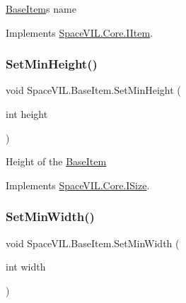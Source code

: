 \mbox{\hyperlink{class_space_v_i_l_1_1_base_item}{Base\+Item}}\textquotesingle{}s name 



Implements \mbox{\hyperlink{interface_space_v_i_l_1_1_core_1_1_i_item}{Space\+V\+I\+L.\+Core.\+I\+Item}}.

\mbox{\label{class_space_v_i_l_1_1_base_item_a5dbc5edca77a56b7998c8cee6b0e9a3a}} 
\subsubsection{\texorpdfstring{Set\+Min\+Height()}{SetMinHeight()}}
{\footnotesize\ttfamily void Space\+V\+I\+L.\+Base\+Item.\+Set\+Min\+Height (\begin{DoxyParamCaption}\item[{int}]{height }\end{DoxyParamCaption})\hspace{0.3cm}{\ttfamily [inline]}}



Height of the \mbox{\hyperlink{class_space_v_i_l_1_1_base_item}{Base\+Item}} 



Implements \mbox{\hyperlink{interface_space_v_i_l_1_1_core_1_1_i_size}{Space\+V\+I\+L.\+Core.\+I\+Size}}.

\mbox{\label{class_space_v_i_l_1_1_base_item_a139384f2e49b221864f8a580973a21c1}} 
\subsubsection{\texorpdfstring{Set\+Min\+Width()}{SetMinWidth()}}
{\footnotesize\ttfamily void Space\+V\+I\+L.\+Base\+Item.\+Set\+Min\+Width (\begin{DoxyParamCaption}\item[{int}]{width }\end{DoxyParamCaption})\hspace{0.3cm}{\ttfamily [inline]}}



